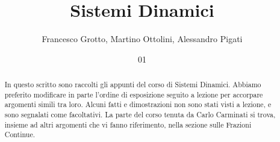 \documentclass[italian,course]{Notes}
\title{Sistemi Dinamici}
\author{Francesco Grotto, Martino Ottolini, Alessandro Pigati}
\date{01}{10}{2014}
\begin{document}
\newtheorem{teo}{Teorema}
\newtheorem{defi}[teo]{Definizione}
\newtheorem{cor}[teo]{Corollario}
\newtheorem{lem}[teo]{Lemma}
\newtheorem{prop}[teo]{Proposizione}
\newtheorem{oss}[teo]{Osservazione}
\newtheorem{esempio}[teo]{Esempio}
\newtheorem{esercizio}[teo]{Esercizio}





\begin{abstract}
 In questo scritto sono raccolti gli appunti del corso di Sistemi Dinamici. Abbiamo preferito modificare in parte l'ordine di esposizione seguito a lezione per accorpare argomenti simili tra loro. Alcuni fatti e dimostrazioni non sono stati visti a lezione, e sono segnalati come facoltativi. La parte del corso tenuta da Carlo Carminati si trova, insieme ad altri argomenti che vi fanno riferimento, nella sezione sulle Frazioni Continue.
\end{abstract}














\end{document}
